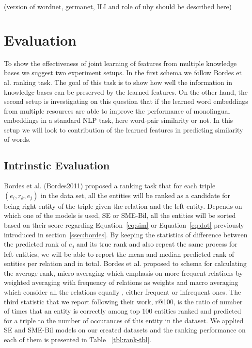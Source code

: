 \documentclass[11pt]{article}
\begin{document}
  (version of wordnet, germanet, ILI and role of uby should be described here)  
 

\section{Evaluation}
\label{sec:eval}

To show the effectiveness of joint learning of features from multiple knowledge bases we suggest 
two experiment setups. In the first schema we follow Bordes et al. ranking task. The goal of this task is
to show how well the information in knowledge bases can be preserved by the learned features. 
 On the other hand, the second
setup is investigating on this question that if the learned word embeddings from multiple resources
are able to improve the performance of monolingual embeddings in a standard NLP
task, here word-pair similarity or not.
In this setup we will look to contribution of the learned features in predicting similarity of words.

\subsection{Intrinstic Evaluation}
\label{ssec:intrinsic}

Bordes et al. (Bordes2011) proposed a ranking task that for each triple $(e_{i} , r_{k}, e_{j} )$ in the data set,
 all the entities will be ranked as a candidate for being right entity of the triple 
 given the relation and the left entity. Depends on which one of the models is used, SE or SME-Bil, all the entities will be sorted
  based on their score regarding Equation~\eqref{eq:sim} or Equation~\ref{eq:dot} previously introduced in section~\ref{ssec:bordes}. 
  By keeping the statistics of difference between the predicted rank of $e_{j}$ and its true rank and also repeat the same process
  for left entities, we will be able to report the mean and median predicted rank of entities per relation and in total. Bordes et al.
   proposed to schema for calculating the average rank, micro averaging which emphasis on more frequent relations by
    weighted averaging with frequency of relations as weights and macro averaging which consider all the relations equally
    , either frequent or infrequent ones. The third statistic that we report following their work, r@100, is the ratio of number of times that 
    an entity is correctly among top 100 entities ranked and predicted for a triple to the number of occurances of this entity in the dataset.
    We applied SE and SME-Bil models on our created datasets and the ranking performance on each of them is presented in Table ~\ref{tbl:rank-tbl}.
	
\end{document}
